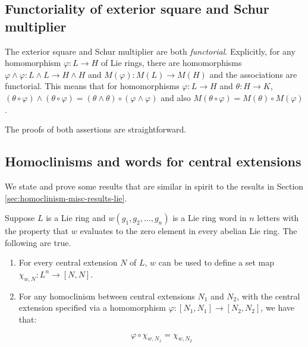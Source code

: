 \documentclass{ucetd}
\begin{document}
\subsection{Functoriality of exterior square and Schur multiplier}\label{sec:functoriality-lie}

The exterior square and Schur multiplier are both {\em
  functorial}. Explicitly, for any homomorphism $\varphi:L \to H$ of
Lie rings, there are homomorphisms $\varphi \wedge \varphi: L \wedge L
\to H \wedge H$ and $M(\varphi): M(L) \to M(H)$ and the associations
are functorial. This means that for homomorphisms $\varphi:L \to H$
and $\theta: H \to K$, $(\theta \circ \varphi) \wedge (\theta \circ
\varphi) = (\theta \wedge \theta) \circ (\varphi \wedge \varphi)$ and
also $M(\theta \circ \varphi) = M(\theta) \circ M(\varphi)$.

The proofs of both assertions are straightforward.%

\subsection{Homoclinisms and words for central extensions}\label{sec:homoclinisms-words-central-extensions-lie}

We state and prove some results that are similar in spirit to the
results in Section \ref{sec:homoclinism-misc-results-lie}.

\begin{lemma}\label{lemma:iterated-bracket-descends-extension-version}
  Suppose $L$ is a Lie ring and $w(g_1,g_2,\dots,g_n)$ is a Lie ring
  word in $n$ letters with the property that $w$ evaluates to the zero
  element in every abelian Lie ring. The following are true.

  \begin{enumerate}
  \item For every central extension $N$ of $L$, $w$ can be used to
    define a set map $\chi_{w,N}: L^n \to [N,N]$.
  \item For any homoclinism between central extensions $N_1$ and
    $N_2$, with the central extension specified via a homomorphism
    $\varphi:[N_1,N_1] \to [N_2,N_2]$, we have that:

    $$\varphi \circ \chi_{w,N_1} = \chi_{w,N_2}$$
  \end{enumerate}
\end{lemma}

\end{document}
